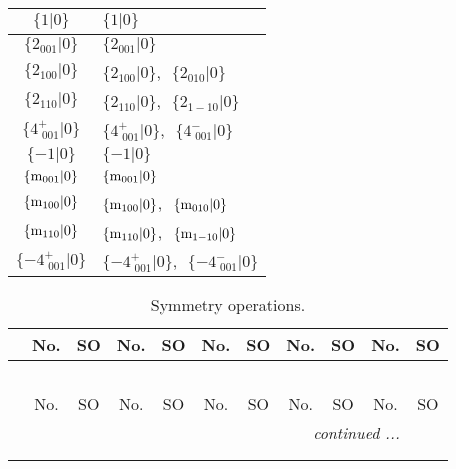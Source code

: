 \documentclass[fleqn,10pt,landscape]{article}
\begin{document}
\begin{itemize}
\begin{center}
\begin{longtable}{c|l}
$\{1|0\}$ & $\{1|0\}$ \\ \hline
$\{2{}_{001}|0\}$ & $\{2{}_{001}|0\}$ \\ \hline
$\{2{}_{100}|0\}$ & $\{2{}_{100}|0\}$,\,\, $\{2{}_{010}|0\}$ \\ \hline
$\{2{}_{110}|0\}$ & $\{2{}_{110}|0\}$,\,\, $\{2{}_{1-10}|0\}$ \\ \hline
$\{4^{+}_{\,\,001}|0\}$ & $\{4^{+}_{\,\,001}|0\}$,\,\, $\{4^{-}_{\,\,001}|0\}$ \\ \hline
$\{-1|0\}$ & $\{-1|0\}$ \\ \hline
$\{{\rm m}_{001}|0\}$ & $\{{\rm m}_{001}|0\}$ \\ \hline
$\{{\rm m}_{100}|0\}$ & $\{{\rm m}_{100}|0\}$,\,\, $\{{\rm m}_{010}|0\}$ \\ \hline
$\{{\rm m}_{110}|0\}$ & $\{{\rm m}_{110}|0\}$,\,\, $\{{\rm m}_{1-10}|0\}$ \\ \hline
$\{-4^{+}_{\,\,001}|0\}$ & $\{-4^{+}_{\,\,001}|0\}$,\,\, $\{-4^{-}_{\,\,001}|0\}$ \\
\end{longtable}
\end{center}
\begin{center}
\renewcommand{\arraystretch}{1.3}
\begin{longtable}{c|cc|cc|cc|cc|cc}
\caption{Symmetry operations.}
 \\
 \hline \hline
 & No. & SO & No. & SO & No. & SO & No. & SO & No. & SO \\ \hline \endfirsthead

\multicolumn{10}{l}{\tablename\ \thetable{}} \\
 \hline \hline
 & No. & SO & No. & SO & No. & SO & No. & SO & No. & SO \\ \hline \endhead

 \hline \hline
\multicolumn{10}{r}{\footnotesize\it continued ...} \\ \endfoot

 \hline \hline
\multicolumn{10}{r}{} \\ \endlastfoot


\end{longtable}
\end{center}
\end{itemize}
\end{document}
